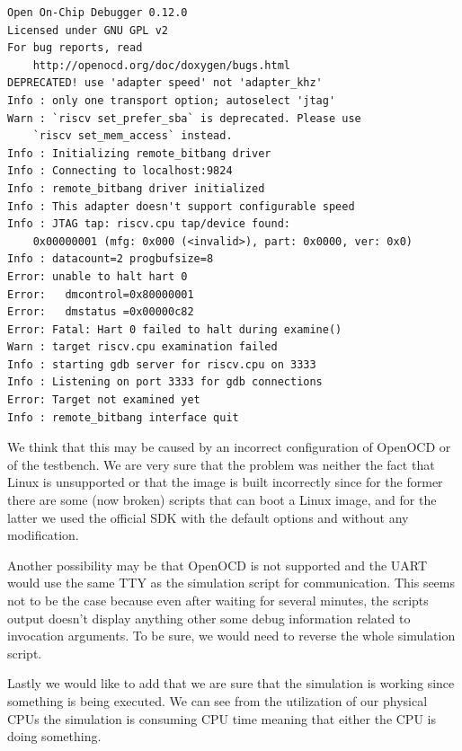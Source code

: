 \documentclass[a4paper,11pt]{article}
\begin{document}
\begin{verbatim}
Open On-Chip Debugger 0.12.0
Licensed under GNU GPL v2
For bug reports, read
    http://openocd.org/doc/doxygen/bugs.html
DEPRECATED! use 'adapter speed' not 'adapter_khz'
Info : only one transport option; autoselect 'jtag'
Warn : `riscv set_prefer_sba` is deprecated. Please use
    `riscv set_mem_access` instead.
Info : Initializing remote_bitbang driver
Info : Connecting to localhost:9824
Info : remote_bitbang driver initialized
Info : This adapter doesn't support configurable speed
Info : JTAG tap: riscv.cpu tap/device found:
    0x00000001 (mfg: 0x000 (<invalid>), part: 0x0000, ver: 0x0)
Info : datacount=2 progbufsize=8
Error: unable to halt hart 0
Error:   dmcontrol=0x80000001
Error:   dmstatus =0x00000c82
Error: Fatal: Hart 0 failed to halt during examine()
Warn : target riscv.cpu examination failed
Info : starting gdb server for riscv.cpu on 3333
Info : Listening on port 3333 for gdb connections
Error: Target not examined yet
Info : remote_bitbang interface quit
\end{verbatim}

We think that this may be caused by an incorrect configuration of OpenOCD or of
the testbench. We are very sure that the problem was neither the fact that Linux
is unsupported or that the image is built incorrectly since for the former
there are some (now broken) scripts that can boot a Linux image, and for the
latter we used the official SDK with the default options and without any
modification.

Another possibility may be that OpenOCD is not supported and the UART would use
the same TTY as the simulation script for communication. This seems not to be
the case because even after waiting for several minutes, the scripts output
doesn't display anything other some debug information related to invocation
arguments. To be sure, we would need to reverse the whole simulation script.

Lastly we would like to add that we are sure that the simulation is working since
something is being executed. We can see from the utilization of our physical CPUs
the simulation is consuming CPU time meaning that either the CPU is doing
something.
\end{document}
